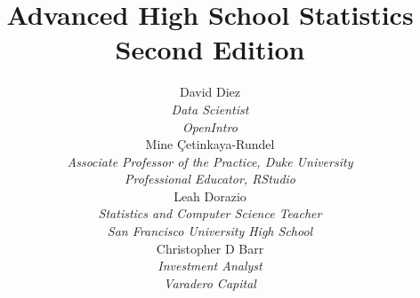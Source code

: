 
\title{\huge Advanced High School Statistics\vspace{1.5mm} \\ \Large Second Edition}
\author{David Diez \\
\small\emph{Data Scientist}\\
\small\emph{OpenIntro} \\[6mm]
Mine \c{C}etinkaya-Rundel \\
\small\emph{Associate Professor of the Practice,
    Duke University} \\
\small\emph{Professional Educator, RStudio} \\[6mm]
Leah Dorazio \\
\small\emph{Statistics and Computer Science Teacher}\\
\small\emph{San Francisco University High School} \\[6mm]
Christopher D Barr \\
\small\emph{Investment Analyst} \\
\small\emph{Varadero Capital} \\
}
